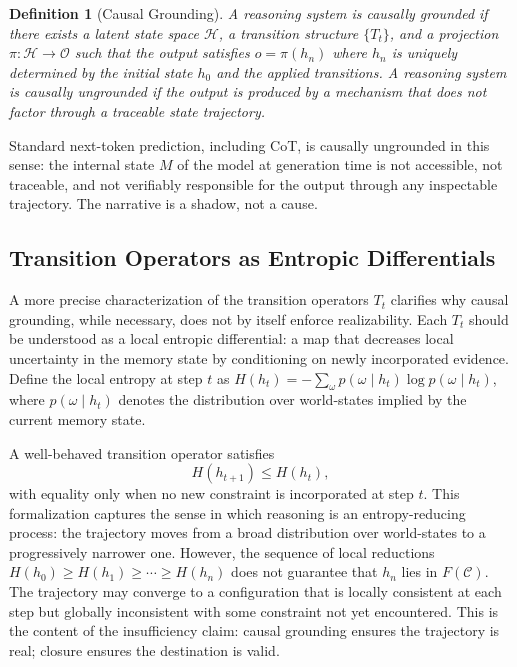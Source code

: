 \documentclass[12pt, oneside]{article}
\newtheorem{definition}{Definition}
\begin{document}
\begin{definition}[Causal Grounding]
A reasoning system is causally grounded if there exists a latent state space $\mathcal{H}$, a transition structure $\{T_t\}$, and a projection $\pi : \mathcal{H} \to \mathcal{O}$ such that the output satisfies $o = \pi(h_n)$ where $h_n$ is uniquely determined by the initial state $h_0$ and the applied transitions. A reasoning system is causally ungrounded if the output is produced by a mechanism that does not factor through a traceable state trajectory.
\end{definition}

Standard next-token prediction, including CoT, is causally ungrounded in this sense: the internal state $M$ of the model at generation time is not accessible, not traceable, and not verifiably responsible for the output through any inspectable trajectory. The narrative is a shadow, not a cause.

\subsection{Transition Operators as Entropic Differentials}

A more precise characterization of the transition operators $T_t$ clarifies why causal grounding, while necessary, does not by itself enforce realizability. Each $T_t$ should be understood as a local entropic differential: a map that decreases local uncertainty in the memory state by conditioning on newly incorporated evidence. Define the local entropy at step $t$ as $H(h_t) = -\sum_\omega p(\omega \mid h_t) \log p(\omega \mid h_t)$, where $p(\omega \mid h_t)$ denotes the distribution over world-states implied by the current memory state.

A well-behaved transition operator satisfies
\begin{equation}
  H(h_{t+1}) \leq H(h_t),
\end{equation}
with equality only when no new constraint is incorporated at step $t$. This formalization captures the sense in which reasoning is an entropy-reducing process: the trajectory moves from a broad distribution over world-states to a progressively narrower one. However, the sequence of local reductions $H(h_0) \geq H(h_1) \geq \cdots \geq H(h_n)$ does not guarantee that $h_n$ lies in $F(\mathcal{C})$. The trajectory may converge to a configuration that is locally consistent at each step but globally inconsistent with some constraint not yet encountered. This is the content of the insufficiency claim: causal grounding ensures the trajectory is real; closure ensures the destination is valid.
\end{document}

